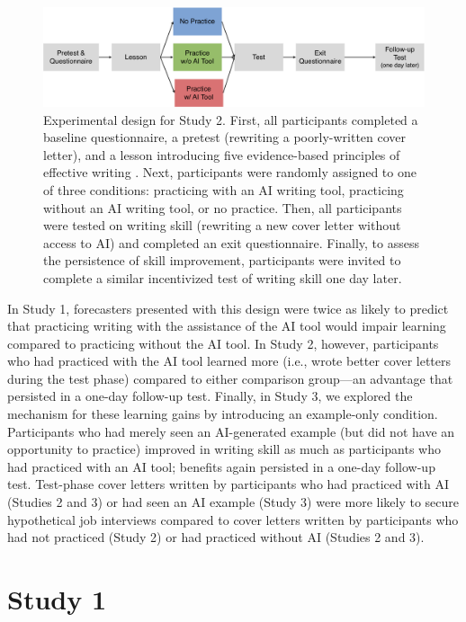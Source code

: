 \documentclass[11pt]{report}
\begin{document}
\begin{mainf}
\begin{figure}[ht]
    \centering
    \includegraphics[width=.9\linewidth]{design_fig.pdf}
    \caption{Experimental design for Study 2. First, all participants completed a baseline questionnaire, a pretest (rewriting a poorly-written cover letter), and a lesson introducing five evidence-based principles of effective writing \cite{rogers2023}. Next, participants were randomly assigned to one of three conditions: practicing with an AI writing tool, practicing without an AI writing tool, or no practice. Then, all participants were tested on writing skill (rewriting a new cover letter without access to AI) and completed an exit questionnaire. Finally, to assess the persistence of skill improvement, participants were invited to complete a similar incentivized test of writing skill one day later.}
    \label{fig:design}
\end{figure}

In Study 1, forecasters presented with this design were twice as likely to predict that practicing writing with the assistance of the AI tool would impair learning compared to practicing without the AI tool. 
In Study 2, however, participants who had practiced with the AI tool learned more (i.e., wrote better cover letters during the test phase) compared to either comparison group---an advantage that persisted in a one-day follow-up test. 
Finally, in Study 3, we explored the mechanism for these learning gains by introducing an example-only condition. 
Participants who had merely seen an AI-generated example (but did not have an opportunity to practice) improved in writing skill as much as participants who had practiced with an AI tool; benefits again persisted in a one-day follow-up test. 
Test-phase cover letters written by participants who had practiced with AI (Studies 2 and 3) or had seen an AI example (Study 3) were more likely to secure hypothetical job interviews compared to cover letters written by participants who had not practiced (Study 2) or had practiced without AI (Studies 2 and 3).

\section{Study 1} 

\end{mainf}
\end{document}
